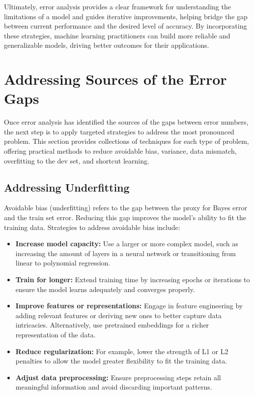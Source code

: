 \documentclass[12pt,openany]{book}
\begin{document}
Ultimately, error analysis provides a clear framework for understanding the limitations of a model and guides iterative improvements, helping bridge the gap between current performance and the desired level of accuracy. By incorporating these strategies, machine learning practitioners can build more reliable and generalizable models, driving better outcomes for their applications.


\section{Addressing Sources of the Error Gaps} \label{sec:addressing_sources_error_gaps}

Once error analysis has identified the sources of the gaps between error numbers, the next step is to apply targeted strategies to address the most pronounced problem. This section provides collections of techniques for each type of problem, offering practical methods to reduce avoidable bias, variance, data mismatch, overfitting to the dev set, and shortcut learning.

\subsection{Addressing Underfitting}

Avoidable bias (underfitting) refers to the gap between the proxy for Bayes error and the train set error. Reducing this gap improves the model’s ability to fit the training data. Strategies to address avoidable bias include:

\begin{itemize}
    \item \textbf{Increase model capacity:} Use a larger or more complex model, such as increasing the amount of layers in a neural network or transitioning from linear to polynomial regression.
    \item \textbf{Train for longer:} Extend training time by increasing epochs or iterations to ensure the model learns adequately and converges properly.
    \item \textbf{Improve features or representations:} Engage in feature engineering by adding relevant features or deriving new ones to better capture data intricacies. Alternatively, use pretrained embeddings for a richer representation of the data.
    \item \textbf{Reduce regularization:} For example, lower the strength of L1 or L2 penalties to allow the model greater flexibility to fit the training data.
    \item \textbf{Adjust data preprocessing:} Ensure preprocessing steps retain all meaningful information and avoid discarding important patterns.
\end{itemize}
\end{document}
